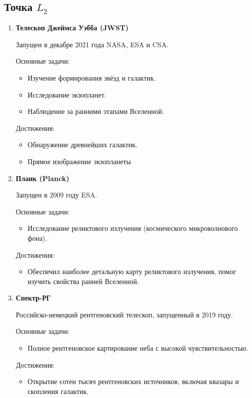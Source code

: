 \documentclass[a4paper,12pt]{article}
\begin{document}
\subsection{Точка $L_2$}

\begin{enumerate}

\item \textbf{Телескоп Джеймса Уэбба (JWST)}
                                         
Запущен в декабре 2021 года NASA, ESA и CSA.

Основные задачи:
\begin{itemize}
\item Изучение формирования звёзд и галактик.
\item Исследование экзопланет.
\item Наблюдение за ранними этапами Вселенной.
\end{itemize}
Достижения:
\begin{itemize}
\item Обнаружение древнейших галактик.
\item Прямое изображение экзопланеты
\end{itemize}

\item \textbf{Планк (Planck)}

Запущен в 2009 году ESA.

Основные задачи:
\begin{itemize}
\item Исследование реликтового излучения (космического микроволнового фона).
\end{itemize}
Достижения:
\begin{itemize}
\item Обеспечил наиболее детальную карту реликтового излучения, помог изучить свойства ранней Вселенной.
\end{itemize}

\item \textbf{Спектр-РГ}

Российско-немецкий рентгеновский телескоп, запущенный в 2019 году.

Основные задачи:
\begin{itemize}
\item Полное рентгеновское картирование неба с высокой чувствительностью.
\end{itemize}
Достижения:
\begin{itemize}
\item Открытие сотен тысяч рентгеновских источников, включая квазары и скопления галактик.
\end{itemize}

\end{enumerate}
\end{document}
